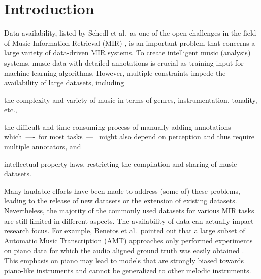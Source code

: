 \documentclass{article}
\begin{document}
\section{Introduction}
Data availability, listed by Schedl et al.\ as one of the open challenges in the field of Music Information Retrieval (MIR) \cite{Schedl2014}, is an important problem that concerns a large variety of data-driven MIR systems. To create intelligent music (analysis) systems, music data with detailed annotations is crucial as training input for machine learning algorithms. %
However, multiple constraints impede the availability of large datasets, including
\begin{inparaenum}[(i)]
    \item   the complexity and variety of music in terms of genres, instrumentation, tonality, etc., 
    \item   the difficult and time-consuming process of manually adding annotations which~----~for most tasks~---~ might also depend on perception and thus require multiple annotators, and 
    \item   intellectual property laws, restricting the compilation and sharing of music datasets.
\end{inparaenum}
Many laudable efforts have been made to address (some of) these problems, leading to the release of new datasets or the extension of existing datasets. %
Nevertheless, the majority of the commonly used datasets for various MIR tasks are still limited in different aspects. The availability of data can actually impact research focus. %
For example, Benetos et al.\ pointed out that a large subset of Automatic Music Transcription (AMT) approaches only performed experiments on piano data for which the audio aligned ground truth was easily obtained \cite{Benetos2013}. This emphasis on piano may lead to models that are strongly biased towards piano-like instruments and cannot be generalized to other melodic instruments. 
\end{document}

